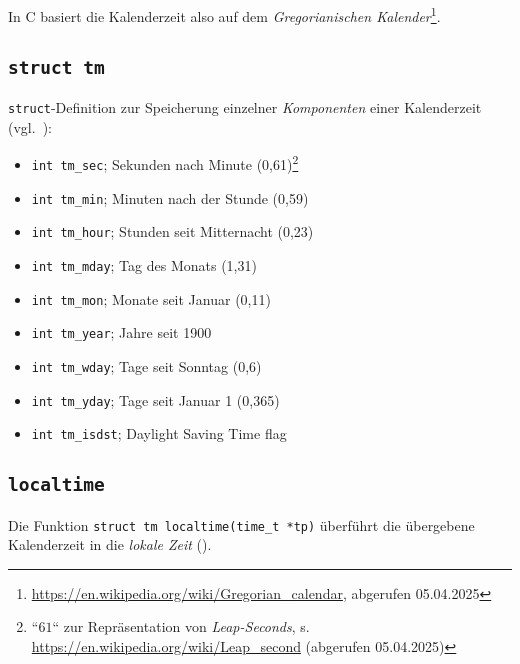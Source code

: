\noindent
In C basiert die Kalenderzeit also auf dem \textit{Gregorianischen Kalender}\footnote{
\url{https://en.wikipedia.org/wiki/Gregorian_calendar}, abgerufen 05.04.2025
}.

\subsection*{\texttt{struct tm}}
\texttt{struct}-Definition zur Speicherung einzelner \textit{Komponenten} einer Kalenderzeit (vgl.~\cite[255]{KR88}):

\begin{itemize}
    \itemsep0.5em
    \item \texttt{int tm\_sec}; Sekunden nach Minute (0,61)\footnote{
    ``$61$`` zur Repräsentation von \textit{Leap-Seconds}, s. \url{https://en.wikipedia.org/wiki/Leap_second} (abgerufen 05.04.2025)
    }
    \item \texttt{int tm\_min}; Minuten nach der Stunde (0,59)
    \item \texttt{int tm\_hour}; Stunden seit Mitternacht (0,23)
    \item \texttt{int tm\_mday}; Tag des Monats (1,31)
    \item \texttt{int tm\_mon}; Monate seit Januar (0,11)
    \item \texttt{int tm\_year}; Jahre seit 1900
    \item \texttt{int tm\_wday}; Tage seit Sonntag (0,6)
    \item \texttt{int tm\_yday}; Tage seit Januar 1 (0,365)
    \item \texttt{int tm\_isdst}; Daylight Saving Time flag
\end{itemize}

\subsection*{\texttt{localtime}}
Die Funktion \texttt{struct tm localtime(time\_t *tp)} überführt die übergebene Kalenderzeit in die \textit{lokale Zeit} (\cite[256]{KR88}).